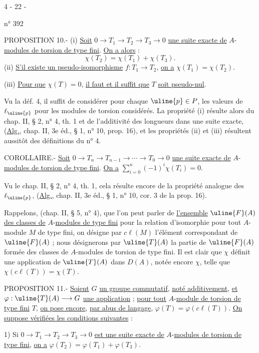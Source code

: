 \begin{center}4 - 22 -\end{center}
\hfill n° 392

PROPOSITION 10.- (i) \uline{Soit} $0\longrightarrow T_1\longrightarrow T_2\longrightarrow T_3\longrightarrow0$ \uline{une suite exacte de} $A$-\uline{modules de torsion de type fini}. \uline{On a alors} :
\[\chi(T_2)=\chi(T_1)+\chi(T_3).\]
(ii) \uline{S'il existe un pseudo-isomorphisme} $f:T_1\longrightarrow T_2$, \uline{on a} $\chi(T_1)=\chi(T_2)$.

(iii) \uline{Pour que} $\chi(T)=0$, \uline{il faut et il suffit que} $T$ \uline{soit pseudo-nul}.

Vu la déf. 4, il suffit de considérer pour chaque $\uline{p}\in P$, les valeurs de $\ell_{\uline{p}}$ pour les modules de torsion considérés. La propriété (i) résulte alors du chap. II, § 2, n° 4, th. 1 et de l'additivité des longueurs dans une suite exacte, (\uline{Alg.}, chap. II, 3e éd., § 1, n° 10, prop. 16), et les propriétés (ii) et (iii) résultent aussitôt des définitions du n° 4.

COROLLAIRE.- \uline{Soit} $0\longrightarrow T_n\longrightarrow T_{n-1}\longrightarrow\cdots\longrightarrow T_0\longrightarrow0$ \uline{une suite exacte de} $A$-\uline{modules de torsion de type fini}. \uline{On a} $\sum_{i=0}^n(-1)^i\chi(T_i)=0$.

Vu le chap. II, § 2, n° 4, th. 1, cela résulte encore de la propriété analogue des $\ell_{\uline{p}}$, (\uline{Alg.}, chap. II, 3e éd., § 1, n° 10, cor. 3 de la prop. 16).

Rappelons, (chap. II, § 5, n° 4), que l'on peut parler de \uline{l'ensemble} $\uline{F}(A)$ \uline{des classes de} $A$-\uline{modules de type fini} pour la relation d'isomorphie pour tout $A$-module $M$ de type fini, on désigne par $c\ell(M)$ l'élément correspondant de $\uline{F}(A)$ ; nous désignerons par $\uline{T}(A)$ la partie de $\uline{F}(A)$ formée des classes de $A$-modules de torsion de type fini. Il est clair que $\chi$ définit une application de $\uline{T}(A)$ dans $D(A)$, notée encore $\chi$, telle que $\chi(c\ell(T))=\chi(T)$.

PROPOSITION 11.- \uline{Soient} $G$ \uline{un groupe commutatif}, \uline{noté additivement}, \uline{et} $\varphi:\uline{T}(A)\longrightarrow G$ \uline{une application} ; \uline{pour tout} $A$-\uline{module de torsion de type fini} $T$, \uline{on pose encore}, \uline{par abus de langage}, $\varphi(T)=\varphi(c\ell(T))$. \uline{On suppose vérifiées les conditions suivantes} :

1) Si $0\longrightarrow T_1\longrightarrow T_2\longrightarrow T_3\longrightarrow0$ \uline{est une suite exacte de} $A$-\uline{modules de torsion de type fini}, \uline{on a} $\varphi(T_2)=\varphi(T_1)+\varphi(T_3)$.

